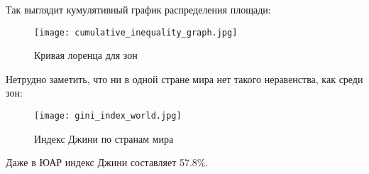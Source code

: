Так выглядит кумулятивный график распределения площади:
\begin{figure}[h!]\label{fig:cumulative_inequality_graph}
    \centering
    \texttt{[image: cumulative\_inequality\_graph.jpg]}
    \caption{Кривая лоренца для зон}
\end{figure}

Нетрудно заметить, что ни в одной стране мира нет такого неравенства, как среди зон:

\begin{figure}[h!]\label{fig:gini_index_world}
    \centering
    \texttt{[image: gini\_index\_world.jpg]}
    \caption{Индекс Джини по странам мира}
\end{figure}
Даже в ЮАР индекс Джини составляет 57.8\%.